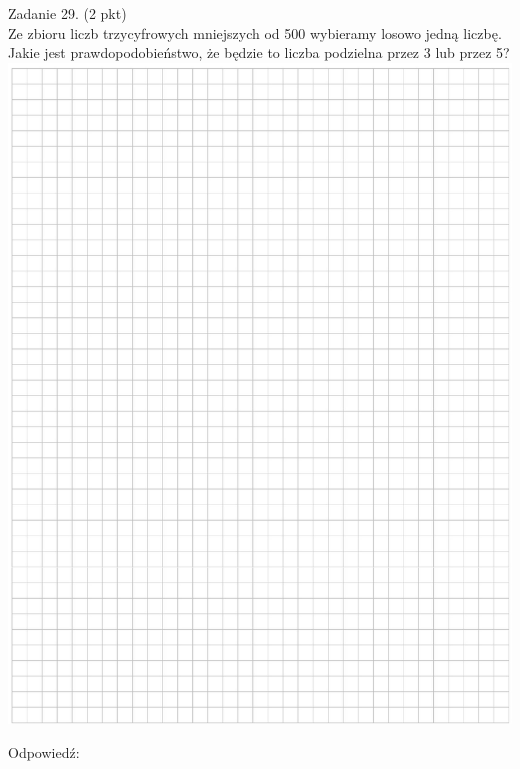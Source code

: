 \documentclass[10pt]{article}
\begin{document}
Zadanie 29. (2 pkt)\\
Ze zbioru liczb trzycyfrowych mniejszych od 500 wybieramy losowo jedną liczbę. Jakie jest prawdopodobieństwo, że będzie to liczba podzielna przez 3 lub przez 5?\\
\includegraphics[max width=\textwidth, center]{2024_11_21_b31e6de468170710de69g-12}

Odpowiedź:
\end{document}
